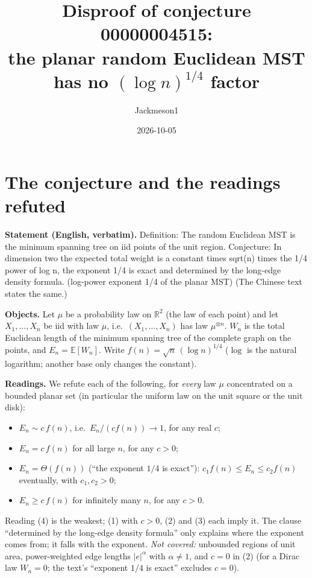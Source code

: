 \documentclass[11pt]{article}
\title{Disproof of conjecture 00000004515:\\ the planar random Euclidean MST has no $(\log n)^{1/4}$ factor}
\author{Jackmeson1}
\date{2026-10-05}
\theoremstyle{definition}
\begin{document}
\maketitle

\section{The conjecture and the readings refuted}

\textbf{Statement (English, verbatim).} Definition: The random Euclidean MST is the minimum
spanning tree on iid points of the unit region. Conjecture: In dimension two the expected total
weight is a constant times sqrt(n) times the 1/4 power of log n, the exponent 1/4 is exact and
determined by the long-edge density formula. (log-power exponent 1/4 of the planar MST)
(The Chinese text states the same.)

\textbf{Objects.} Let $\mu$ be a probability law on $\mathbb{R}^2$ (the law of each point) and
let $X_1,\dots,X_n$ be iid with law $\mu$, i.e.\ $(X_1,\dots,X_n)$ has law $\mu^{\otimes n}$.
$W_n$ is the total Euclidean length of the minimum spanning tree of the complete graph on the
points, and $E_n = \mathbb{E}[W_n]$. Write $f(n)=\sqrt{n}\,(\log n)^{1/4}$ ($\log$ is the
natural logarithm; another base only changes the constant).

\textbf{Readings.} We refute each of the following, for \emph{every} law $\mu$ concentrated on
a bounded planar set (in particular the uniform law on the unit square or the unit disk):
\begin{itemize}
\item[(1)] $E_n \sim c\,f(n)$, i.e.\ $E_n/(c f(n)) \to 1$, for any real $c$;
\item[(2)] $E_n = c\,f(n)$ for all large $n$, for any $c>0$;
\item[(3)] $E_n = \Theta(f(n))$ (``the exponent $1/4$ is exact''): $c_1 f(n)\le E_n\le c_2 f(n)$
  eventually, with $c_1,c_2>0$;
\item[(4)] $E_n \ge c\,f(n)$ for infinitely many $n$, for any $c>0$.
\end{itemize}
Reading (4) is the weakest; (1) with $c>0$, (2) and (3) each imply it. The clause ``determined
by the long-edge density formula'' only explains where the exponent comes from; it falls with
the exponent. \emph{Not covered:} unbounded regions of unit area, power-weighted edge lengths
$|e|^\alpha$ with $\alpha\ne 1$, and $c=0$ in (2) (for a Dirac law $W_n=0$; the text's ``exponent
$1/4$ is exact'' excludes $c=0$).
\end{document}
